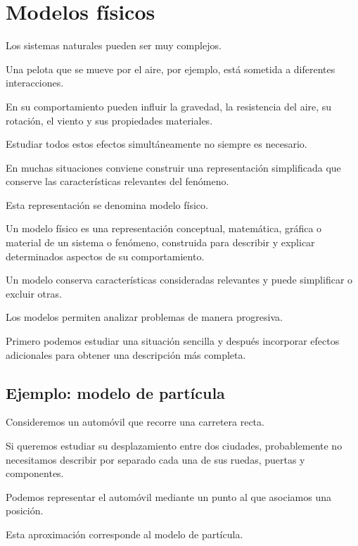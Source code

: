\section{Modelos físicos}

Los sistemas naturales pueden ser muy complejos.

Una pelota que se mueve por el aire, por ejemplo,
está sometida a diferentes interacciones.

En su comportamiento pueden influir la gravedad,
la resistencia del aire, su rotación, el viento
y sus propiedades materiales.

Estudiar todos estos efectos simultáneamente
no siempre es necesario.

En muchas situaciones conviene construir
una representación simplificada que conserve
las características relevantes del fenómeno.

Esta representación se denomina modelo físico.

\begin{definicion}

Un modelo físico es una representación conceptual,
matemática, gráfica o material de un sistema
o fenómeno, construida para describir y explicar
determinados aspectos de su comportamiento.

Un modelo conserva características consideradas
relevantes y puede simplificar o excluir otras.

\end{definicion}

Los modelos permiten analizar problemas
de manera progresiva.

Primero podemos estudiar una situación sencilla
y después incorporar efectos adicionales
para obtener una descripción más completa.


\subsection{Ejemplo: modelo de partícula}

Consideremos un automóvil que recorre
una carretera recta.

Si queremos estudiar su desplazamiento entre
dos ciudades, probablemente no necesitamos
describir por separado cada una de sus ruedas,
puertas y componentes.

Podemos representar el automóvil mediante
un punto al que asociamos una posición.

Esta aproximación corresponde al modelo
de partícula.

